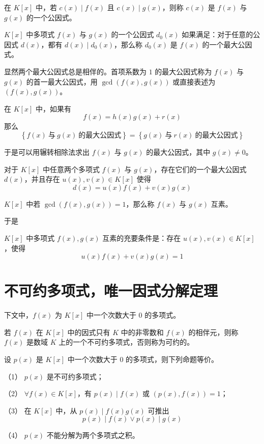 在 $K[x]$ 中，若 $c(x) \mid f(x)$ 且 $c(x) \mid g(x)$，则称 $c(x)$ 是 $f(x)$ 与 $g(x)$ 的一个公因式。

\begin{definition}
    $K[x]$ 中多项式 $f(x)$ 与 $g(x)$ 的一个公因式 $d_0(x)$ 如果满足：对于任意的公因式 $d(x)$，都有 $d(x) \mid d_0(x)$，那么称 $d_0(x)$ 是 $f(x)$ 的一个最大公因式。
\end{definition}

显然两个最大公因式总是相伴的。首项系数为 $1$ 的最大公因式称为 $f(x)$ 与 $g(x)$ 的首一最大公因式，用 $\gcd(f(x), g(x))$ 或直接表述为 $(f(x), g(x))$。

\begin{lemma}
    在 $K[x]$ 中，如果有
    \[f(x) = h(x)g(x) + r(x)\]
    那么
    \[\left\{f(x)\ \text{与}\ g(x)\ \text{的最大公因式}\right\} = \left\{g(x)\ \text{与}\ r(x)\ \text{的最大公因式}\right\}\]
\end{lemma}

于是可以用辗转相除法求出 $f(x)$ 与 $g(x)$ 的最大公因式，其中 $g(x) \ne 0$。

\begin{theorem}
    对于 $K[x]$ 中任意两个多项式 $f(x)$ 与 $g(x)$，存在它们的一个最大公因式 $d(x)$，并且存在 $u(x),v(x) \in K[x]$ 使得
    \[d(x) = u(x)f(x) + v(x)g(x)\]
\end{theorem}

\begin{definition}
    $K[x]$ 中若 $\gcd(f(x), g(x)) = 1$，那么称 $f(x)$ 与 $g(x)$ 互素。 
\end{definition}

于是

\begin{definition}
    $K[x]$ 中多项式 $f(x), g(x)$ 互素的充要条件是：存在 $u(x),v(x) \in K[x]$，使得
    \[u(x)f(x) + v(x)g(x) = 1\]
\end{definition}

\section{不可约多项式，唯一因式分解定理}

下文中，$f(x)$ 为 $K[x]$ 中一个次数大于 $0$ 的多项式。

\begin{definition}
    若 $f(x)$ 在 $K[x]$ 中的因式只有 $K$ 中的非零数和 $f(x)$ 的相伴元，则称 $f(x)$ 是数域 $K$ 上的一个不可约多项式，否则称为可约的。
\end{definition}

\begin{theorem}
    设 $p(x)$ 是 $K[x]$ 中一个次数大于 $0$ 的多项式，则下列命题等价。
    
    （1） $p(x)$ 是不可约多项式；
    
    （2） $\forall f(x) \in K[x]$，有 $p(x) \mid f(x)$ 或 $(p(x), f(x)) = 1$；
    
    （3） 在 $K[x]$ 中，从 $p(x) \mid f(x)g(x)$ 可推出
    \[p(x) \mid f(x) \lor p(x) \mid g(x)\]
    
    （4） $p(x)$ 不能分解为两个多项式之积。
\end{theorem}

